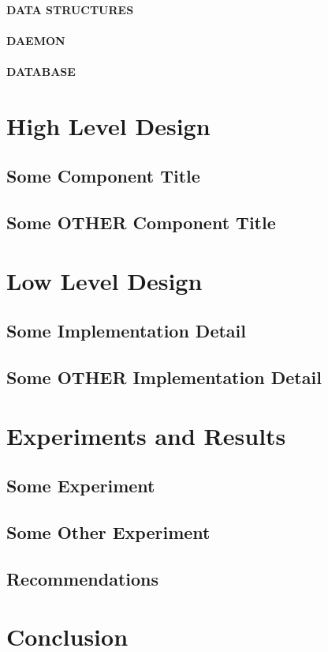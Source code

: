 \documentclass{acmtog}
\begin{document}
\paragraph{DATA STRUCTURES}
\paragraph{DAEMON}
\paragraph{DATABASE}
\section{High Level Design}
\subsection{Some Component Title}
\subsection{Some OTHER Component Title}
\section{Low Level Design}
\subsection{Some Implementation Detail}
\subsection{Some OTHER Implementation Detail}
\section{Experiments and Results}
\subsection{Some Experiment}
\subsection{Some Other Experiment}
\subsection{Recommendations}
\section{Conclusion}
\end{document}
